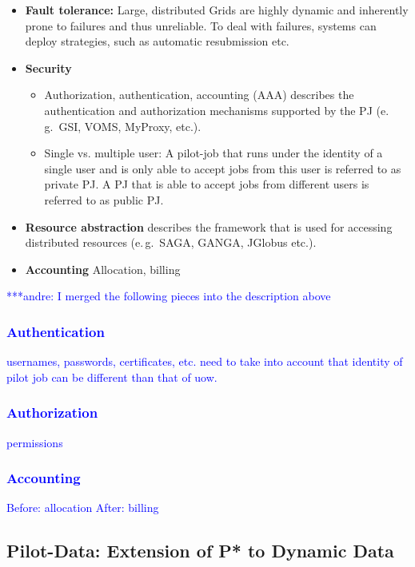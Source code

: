\documentclass[conference,final]{IEEEtran}
\newcommand{\jhanote}[1]{ {\textcolor{red} { ***shantenu: #1 }}}
\newcommand{\alnote}[1]{ {\textcolor{blue} { ***andre: #1 }}}
\newcommand{\alnote}[1]{}
\newcommand{\jhanote}[1]{}
\begin{document}
\begin{itemize}
	\item \textbf{Fault tolerance:} Large, distributed Grids are highly dynamic 
	and inherently prone to failures and thus unreliable. To deal with failures, 
	systems can deploy strategies, such as automatic resubmission etc.
	\item \textbf{Security}
	\begin{itemize}
       \item Authorization, authentication, accounting (AAA) describes the 
       authentication and authorization mechanisms supported by the PJ (e.\,g.\  
       GSI, VOMS, MyProxy, etc.). 
	   \item Single vs. multiple user: A pilot-job that runs under the identity 
	   of a single user and is only able to accept jobs from this user is 
	   referred to as private PJ. A PJ that is able to accept jobs from 
	   different users is referred to as public PJ.
	\end{itemize}
	\item \textbf{Resource abstraction} describes the framework that is used for accessing distributed resources (e.\,g.\ SAGA, GANGA, JGlobus etc.).
	\item \textbf{Accounting} Allocation, billing
\end{itemize}


\alnote{I merged the following pieces into the description above
\subsubsection{Authentication}
usernames, passwords, certificates, etc.
need to take into account that identity of pilot job can be different than that of uow.
\subsubsection{Authorization}
permissions
\subsubsection{Accounting}
Before: allocation
After: billing 
}


\subsection{Pilot-Data: Extension of P* to Dynamic Data}
\label{sec:pilot-data}

\end{document}
